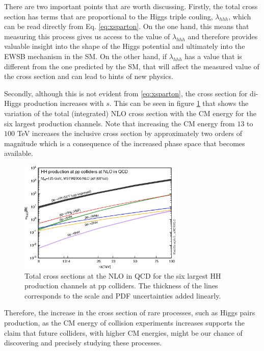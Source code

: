 There are two important points that are worth discussing. Firstly, the total cross section has terms that are proportional to the Higgs triple couling, $\lambda_{hhh}$, which can be read directly from Eq. \ref{eq:xsparton}. On the one hand, this means that measuring this process gives us access to the value of $\lambda_{hhh}$ and therefore provides valuable insight into the shape of the Higgs potential and ultimately into the EWSB mechanism in the SM. On the other hand, if $\lambda_{hhh}$ has a value that is different from the one predicted by the SM, that will affect the measured value of the cross section and can lead to hints of new physics. 

Secondly, although this is not evident from \ref{eq:xsparton}, the cross section for di-Higgs production increases with $s$. This can be seen in figure \ref{fig:HHxs_s} that shows the variation of the total (integrated) NLO cross section with the CM energy for the six largest production channels. Note that increasing the CM energy from $13$ to $100$ TeV increases the inclusive cross section by approximately two orders of magnitude which is a consequence of the increased phase space that becomes available.

\begin{figure}[]
	\centering
	\includegraphics[width=0.7\textwidth]{./Figures/HH-xsec.png}
	\caption{Total cross sections at the NLO in QCD for the six largest HH production channels at pp colliders. The thickness of the lines corresponds to the scale and PDF uncertainties added linearly.}
	\label{fig:HHxs_s}
\end{figure}

Therefore, the increase in the cross section of rare processes, such as Higgs pairs production, as the CM energy of collision experiments increases supports the claim that future colliders, with higher CM energies, might be our chance of discovering and precisely studying these processes.

